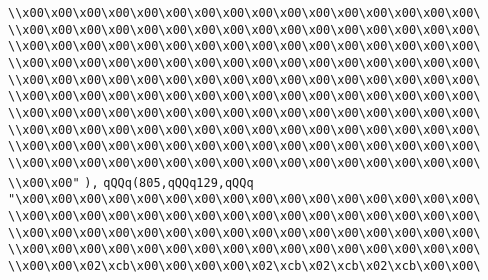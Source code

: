 \verb|\\x00\x00\x00\x00\x00\x00\x00\x00\x00\x00\x00\x00\x00\x00\x00\x00\|\newline
\verb|\\x00\x00\x00\x00\x00\x00\x00\x00\x00\x00\x00\x00\x00\x00\x00\x00\|\newline
\verb|\\x00\x00\x00\x00\x00\x00\x00\x00\x00\x00\x00\x00\x00\x00\x00\x00\|\newline
\verb|\\x00\x00\x00\x00\x00\x00\x00\x00\x00\x00\x00\x00\x00\x00\x00\x00\|\newline
\verb|\\x00\x00\x00\x00\x00\x00\x00\x00\x00\x00\x00\x00\x00\x00\x00\x00\|\newline
\verb|\\x00\x00\x00\x00\x00\x00\x00\x00\x00\x00\x00\x00\x00\x00\x00\x00\|\newline
\verb|\\x00\x00\x00\x00\x00\x00\x00\x00\x00\x00\x00\x00\x00\x00\x00\x00\|\newline
\verb|\\x00\x00\x00\x00\x00\x00\x00\x00\x00\x00\x00\x00\x00\x00\x00\x00\|\newline
\verb|\\x00\x00\x00\x00\x00\x00\x00\x00\x00\x00\x00\x00\x00\x00\x00\x00\|\newline
\verb|\\x00\x00\x00\x00\x00\x00\x00\x00\x00\x00\x00\x00\x00\x00\x00\x00\|\newline
\verb|\\x00\x00"|\newline
\verb|),|\newline
\verb|qQQq(805,qQQq129,qQQq|\newline
\verb|"\x00\x00\x00\x00\x00\x00\x00\x00\x00\x00\x00\x00\x00\x00\x00\x00\|\newline
\verb|\\x00\x00\x00\x00\x00\x00\x00\x00\x00\x00\x00\x00\x00\x00\x00\x00\|\newline
\verb|\\x00\x00\x00\x00\x00\x00\x00\x00\x00\x00\x00\x00\x00\x00\x00\x00\|\newline
\verb|\\x00\x00\x00\x00\x00\x00\x00\x00\x00\x00\x00\x00\x00\x00\x00\x00\|\newline
\verb|\\x00\x00\x02\xcb\x00\x00\x00\x00\x02\xcb\x02\xcb\x02\xcb\x00\x00\|\newline
